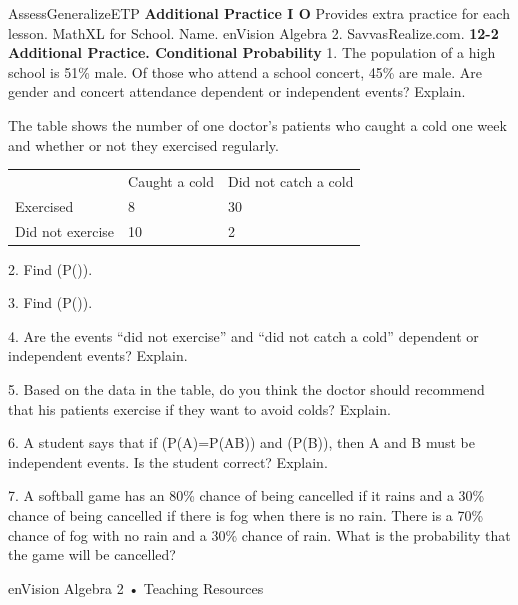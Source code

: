 \documentclass{article}
\newenvironment{te-addendum}[2]{}{}     %
\newcommand{\answer}[1]{}               %
\newcommand{\te}[1]{}                   %
\begin{document}
\begin{te-addendum}{Assess}{GeneralizeETP}
\textbf{Additional Practice I O}
Provides extra practice for each lesson. MathXL for School.
Name. enVision Algebra 2. SavvasRealize.com.
\textbf{12-2 Additional Practice. Conditional Probability}
1. The population of a high school is 51\% male. Of those who attend a school concert, 45\% are male. Are gender and concert attendance dependent or independent events? Explain.
\answer{Dependent: (P(M)=0.51), (P(M\mid C)=0.45), so (P(M\mid C)\neq P(M))}
The table shows the number of one doctor's patients who caught a cold one week and whether or not they exercised regularly.
\begin{tabular}{lll}
 & Caught a cold & Did not catch a cold \\
Exercised & 8 & 30 \\
Did not exercise & 10 & 2 \\
\end{tabular}
2. Find (P(\mid{})).
\answer{(\frac1{16})}
3. Find (P(\mid{})).
\answer{(\frac16)}
4. Are the events “did not exercise” and “did not catch a cold” dependent or independent events? Explain.
\answer{Dependent events since (P(\text{did not exercise})=\frac6{25}) and (P(\text{did not catch a cold})=\frac{16}{25}), which differ from the conditional probabilities found in 3 and 4, respectively.}
\te{Printed 3 and 4; likely 2 and 3.}
5. Based on the data in the table, do you think the doctor should recommend that his patients exercise if they want to avoid colds? Explain.
\answer{Sample answer: Yes, because (P(\text{caught a cold}\mid\text{exercised})) is about 21\% while (P(\text{caught a cold}\mid\text{did not exercise})) is about 83\%. It seems that exercising may reduce the chance of catching a cold.}
6. A student says that if (P(A)=P(A\mid B)) and (P(B)), then A and B must be independent events. Is the student correct? Explain.
\answer{Yes, if A and B are independent, then the probability of A will be the same whether or not B occurs.}
\te{Printed explanation states the reverse implication of the claim being justified.}
7. A softball game has an 80\% chance of being cancelled if it rains and a 30\% chance of being cancelled if there is fog when there is no rain. There is a 70\% chance of fog with no rain and a 30\% chance of rain. What is the probability that the game will be cancelled?
\answer{0.45 or 45\%}
enVision Algebra 2 • Teaching Resources
\end{te-addendum}
\end{document}

